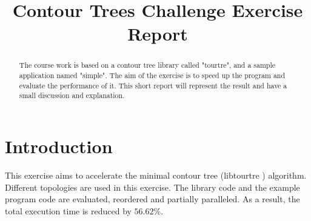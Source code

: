 \documentclass[conference]{IEEEtran}
\begin{document}
%
\title{Contour Trees Challenge Exercise Report}


\author{
\and
{}
\and
{}
}

\maketitle

\begin{abstract}
The course work is based on a contour tree library called "tourtre",
and a sample application named "simple". The aim of the exercise is to speed up the program and evaluate the performance of it. This short report will represent the result and have a small discussion and explanation. 
\end{abstract}

\IEEEpeerreviewmaketitle

\section{Introduction}

This exercise aims to accelerate the minimal contour tree (libtourtre \cite{libtourtre}) algorithm. Different topologies are used in this exercise. The library code and the example program code are evaluated, reordered and partially paralleled. As a result, the total execution time is reduced by $56.62 \%$.
\end{document}
